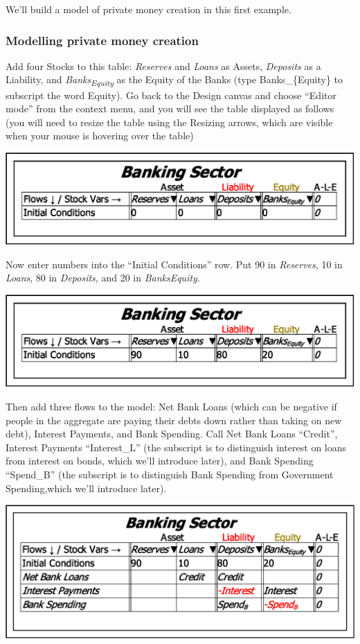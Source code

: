 We'll build a model of private money creation in this first example.

\subsubsection{Modelling private money creation}

Add four Stocks to this table: \emph{Reserves }and \emph{Loans} as
Assets, \emph{Deposits} as a Liability, and \emph{Banks}\textsubscript{\emph{Equity}}
as the Equity of the Banks (type Banks\_\{Equity\} to subscript the
word Equity). Go back to the Design canvas and choose ``Editor mode''
from the context menu, and you will see the table displayed as follows
(you will need to resize the table using the Resizing arrows, which
are visible when your mouse is hovering over the table)

\includegraphics{images/MonetaryModel01GodleyTable02}

Now enter numbers into the ``Initial Conditions'' row. Put 90 in
\emph{Reserves}, 10 in \emph{Loans}, 80 in \emph{Deposits}, and 20
in \emph{BanksEquity}. 

\includegraphics{images/MonetaryModel01GodleyTable03InitialConditions}

Then add three flows to the model: Net Bank Loans (which can be negative
if people in the aggregate are paying their debts down rather than
taking on new debt), Interest Payments, and Bank Spending. Call Net
Bank Loans ``Credit'', Interest Payments ``Interest\_L'' (the
subscript is to distinguish interest on loans from interest on bonds,
which we'll introduce later), and Bank Spending ``Spend\_B'' (the
subscript is to distinguish Bank Spending from Government Spending,which
we'll introduce later).

\includegraphics{images/MonetaryModel01GodleyTable04AddFlows}

